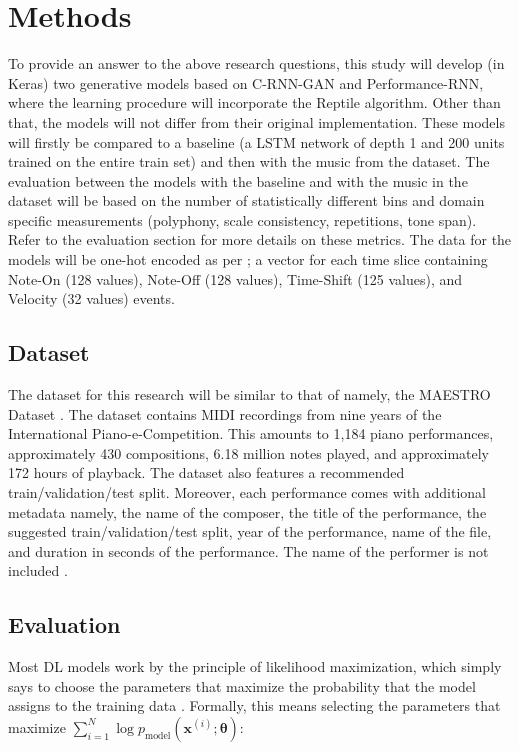 \documentclass[11pt, a4paper, man, floatsintext]{apa6}
\begin{document}
\section{Methods}

To provide an answer to the above research questions, this study will develop (in Keras) two generative models based on C-RNN-GAN and Performance-RNN, where the learning procedure will incorporate the Reptile algorithm. Other than that, the models will not differ from their original implementation. These models will firstly be compared to a baseline (a LSTM network of depth 1 and 200 units trained on the entire train set) and then with the music from the dataset. The evaluation between the models with the baseline and with the music in the dataset will be based on the number of statistically different bins \parencite[NDB;][]{richardson_gans_2018} and domain specific measurements (polyphony, scale consistency, repetitions, tone span). Refer to the evaluation section for more details on these metrics. The data for the models will be one-hot encoded as per \textcite{oore_this_2018}; a vector for each time slice containing Note-On (128 values), Note-Off (128 values), Time-Shift (125 values), and Velocity (32 values) events.

\subsection{Dataset}

The dataset for this research will be similar to that of \textcite{oore_this_2018} namely, the MAESTRO Dataset \parencite{hawthorne_enabling_2018}. The dataset contains MIDI recordings from nine years of the International Piano-e-Competition. This amounts to 1,184 piano performances, approximately 430 compositions, 6.18 million notes played, and approximately 172 hours of playback. The dataset also features a recommended train/validation/test split. Moreover, each performance comes with additional metadata namely, the name of the composer, the title of the performance, the suggested train/validation/test split, year of the performance, name of the file, and duration in seconds of the performance. The name of the performer is not included \parencite{hawthorne_enabling_2018}.

\subsection{Evaluation}

Most DL models work by the principle of likelihood maximization, which simply says to choose the parameters that maximize the probability that the model assigns to the training data \parencite{goodfellow_nips_2016}. Formally, this means selecting the parameters that maximize $\sum_{i=1}^N \log p_{\text{model}}(\bm{x}^{(i)}; \bm{\theta})$:
\end{document}
